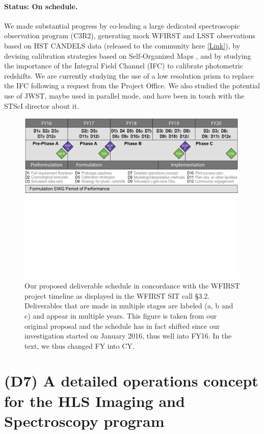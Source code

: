\paragraph*{Status: On schedule.} We made substantial progress by co-leading a large
dedicated spectroscopic observation program (C3R2), generating mock WFIRST and
LSST observations based on HST CANDELS data (released to the community here \href{http://www.wfirst-hls-cosmology.org/products/}{[Link]}), by devising calibration strategies based on Self-Organized Maps \citep{Masters2017,Hemmati:2018}, and by studying the importance of the Integral Field Channel (IFC) to calibrate photometric redshifts. We are currently studying the use of a low resolution prism to replace the IFC following a request from the Project Office. We also studied the potential use of JWST, maybe used in parallel mode, and have been in touch with the STScI director about it. 

\begin{figure}
\includegraphics[width=0.99\textwidth]{Plots/wfirst_milestones_v2.pdf}
\caption{Our proposed deliverable schedule in concordance with the WFIRST
project timeline as displayed in the WFIRST SIT call \S 3.2. Deliverables that
are made in multiple stages are labeled (a, b and c) and appear in multiple
years. This figure is taken from our original proposal and the schedule has in
fact shifted since our investigation started on January 2016, thus well into
FY16. In the text, we thus changed FY into CY.} \label{tab:milestones_mgt}
\end{figure}


\section*{(D7) A detailed operations concept for the HLS Imaging and Spectroscopy
program}

